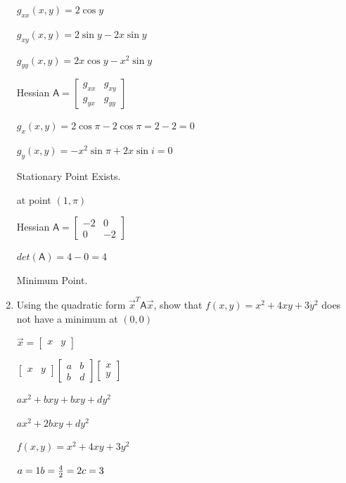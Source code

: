 \documentclass[answers, a4paper, 11pt]{exam}
\newcommand{\mat}[1]{\boldsymbol { \mathsf{#1}} }
\begin{document}
\begin{enumerate}
\begin{solution}
$g_{xx}(x,y) = 2\cos{y}$

$g_{xy}(x,y) = 2\sin{y} - 2x\sin{y}$

$g_{yy}(x,y) = 2x\cos{y} - x^2\sin{y}$

Hessian $\mat A = 
\begin{bmatrix}
g_{xx} & g_{xy} \\ g_{yx} & g_{yy}
\end{bmatrix}$

$g_x(x,y) = 2\cos{\pi} - 2\cos{\pi} = 2 - 2 = 0$

$g_y(x,y) = -x^2\sin{\pi} + 2x\sin{i} = 0$

Stationary Point Exists.

at point $(1, \pi)$

Hessian $\mat A = 
\begin{bmatrix}
-2 & 0 \\ 0 & -2
\end{bmatrix}$

$det(\mat A) = 4 - 0 = 4$

Minimum Point. 

\end{solution}



\item Using the quadratic form $\vec x^T \mat A \vec x$, show that $f(x, y) = x^2 + 4xy + 3y^2$ does not have a minimum at $(0, 0)$

\begin{solution}

$
\vec{x} = \begin{bmatrix}
    x & y 
\end{bmatrix}
$

$
\begin{bmatrix}
    x & y 
\end{bmatrix} 
\begin{bmatrix}
    a & b \\ b & d 
\end{bmatrix}
\begin{bmatrix}
    x \\ y 
\end{bmatrix}
$

$ax^2 + bxy + bxy + dy^2$

$ax^2 + 2bxy + dy^2$

$f(x,y) = x^2 + 4xy + 3y^2$

$a = 1 \\ b = \frac{4}{2} = 2 \\ c = 3$


\end{solution}
\end{enumerate}
\end{document}
